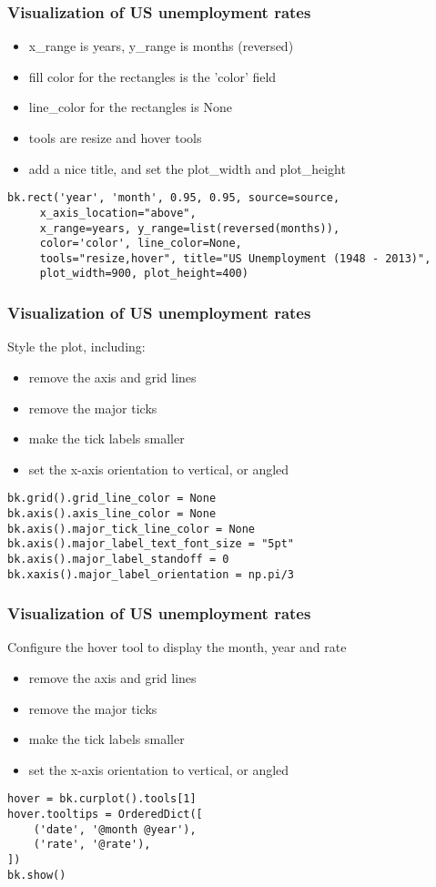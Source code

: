 \begin{frame}[fragile] \frametitle{Visualization of US unemployment rates}
\begin{itemize}
\item x\_range is years, y\_range is months (reversed)
\item fill color for the rectangles is the 'color' field
\item line\_color for the rectangles is None
\item tools are resize and hover tools
\item add a nice title, and set the plot\_width and plot\_height
\end{itemize}
\begin{lstlisting}
bk.rect('year', 'month', 0.95, 0.95, source=source,
     x_axis_location="above",
     x_range=years, y_range=list(reversed(months)),
     color='color', line_color=None,
     tools="resize,hover", title="US Unemployment (1948 - 2013)",
     plot_width=900, plot_height=400)
\end{lstlisting}
\end{frame}

\begin{frame}[fragile] \frametitle{Visualization of US unemployment rates}
Style the plot, including:
\begin{itemize}
\item remove the axis and grid lines
\item remove the major ticks
\item make the tick labels smaller
\item set the x-axis orientation to vertical, or angled
\end{itemize}
\begin{lstlisting}
bk.grid().grid_line_color = None
bk.axis().axis_line_color = None
bk.axis().major_tick_line_color = None
bk.axis().major_label_text_font_size = "5pt"
bk.axis().major_label_standoff = 0
bk.xaxis().major_label_orientation = np.pi/3
\end{lstlisting}
\end{frame}

\begin{frame}[fragile] \frametitle{Visualization of US unemployment rates}
Configure the hover tool to display the month, year and rate
\begin{itemize}
\item remove the axis and grid lines
\item remove the major ticks
\item make the tick labels smaller
\item set the x-axis orientation to vertical, or angled
\end{itemize}
\begin{lstlisting}
hover = bk.curplot().tools[1]
hover.tooltips = OrderedDict([
    ('date', '@month @year'),
    ('rate', '@rate'),
])
bk.show()
\end{lstlisting}
\end{frame}

